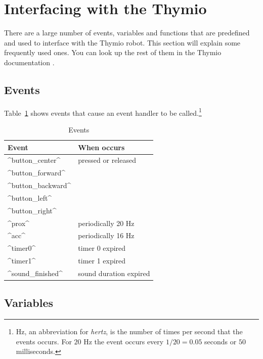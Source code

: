 \documentclass[11pt,a4paper]{article}
\begin{document}

\section{Interfacing with the Thymio}\label{s.interface}

There are a large number of events, variables and functions that are predefined and used to interface with the Thymio robot. This section will explain some frequently used ones. You can look up the rest of them in the Thymio documentation \cite{thymio}.

\subsection{Events}

Table~\ref{t.events} shows events that cause an event handler to be called.\footnote{Hz, an abbreviation for \emph{hertz}, is the number of times per second that the events occurs. For $20$ Hz the event occurs every $1/20=0.05$ seconds or $50$ milliseconds.}

\begin{table}[t]
\renewcommand{\arraystretch}{.85}
\begin{center}
\begin{tabular}{|l|l|}
\hline
Event& When occurs\\\hline
^button_center^& pressed or released\\
^button_forward^&\\
^button_backward^&\\
^button_left^&\\
^button_right^&\\
\hline
^prox^&periodically 20 Hz\\
^acc^&periodically 16 Hz\\
\hline
^timer0^&timer 0 expired\\
^timer1^&timer 1 expired\\
^sound_finished^&sound duration expired\\
\hline
\end{tabular}
\end{center}
\caption{Events}\label{t.events}
\end{table}

\subsection{Variables}
\end{document}
